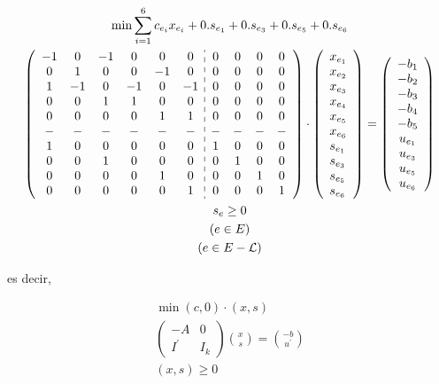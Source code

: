 \documentclass[10pt]{article}
\begin{document}
$$
\begin{gathered}
\min \sum_{i=1}^{6} c_{e_{i}} x_{e_{i}}+0 . s_{e_{1}}+0 . s_{e_{3}}+0 . s_{e_{5}}+0 . s_{e_{6}} \\
\left(\begin{array}{cccccc:cccc}
-1 & 0 & -1 & 0 & 0 & 0 & 0 & 0 & 0 & 0 \\
0 & 1 & 0 & 0 & -1 & 0 & 0 & 0 & 0 & 0 \\
1 & -1 & 0 & -1 & 0 & -1 & 0 & 0 & 0 & 0 \\
0 & 0 & 1 & 1 & 0 & 0 & 0 & 0 & 0 & 0 \\
0 & 0 & 0 & 0 & 1 & 1 & 0 & 0 & 0 & 0 \\
- & - & - & - & - & - & - & - & - & - \\
1 & 0 & 0 & 0 & 0 & 0 & 1 & 0 & 0 & 0 \\
0 & 0 & 1 & 0 & 0 & 0 & 0 & 1 & 0 & 0 \\
0 & 0 & 0 & 0 & 1 & 0 & 0 & 0 & 1 & 0 \\
0 & 0 & 0 & 0 & 0 & 1 & 0 & 0 & 0 & 1
\end{array}\right) \cdot\left(\begin{array}{l}
x_{e_{1}} \\
x_{e_{2}} \\
x_{e_{3}} \\
x_{e_{4}} \\
x_{e_{5}} \\
x_{e_{6}} \\
s_{e_{1}} \\
s_{e_{3}} \\
s_{e_{5}} \\
s_{e_{6}}
\end{array}\right)=\left(\begin{array}{c}
-b_{1} \\
-b_{2} \\
-b_{3} \\
-b_{4} \\
-b_{5} \\
u_{e_{1}} \\
u_{e_{3}} \\
u_{e_{5}} \\
u_{e_{6}}
\end{array}\right) \\
s_{e} \geq 0 \\
(e \in E) \\
(e \in E-\mathcal{L})
\end{gathered}
$$

es decir,

$$
\begin{gathered}
\min (c, 0) \cdot(x, s) \\
\left(\begin{array}{cc}
-A & 0 \\
I^{\prime} & I_{k}
\end{array}\right)\binom{x}{s}=\binom{-b}{u^{\prime}} \\
(x, s) \geq 0
\end{gathered}
$$
\end{document}

